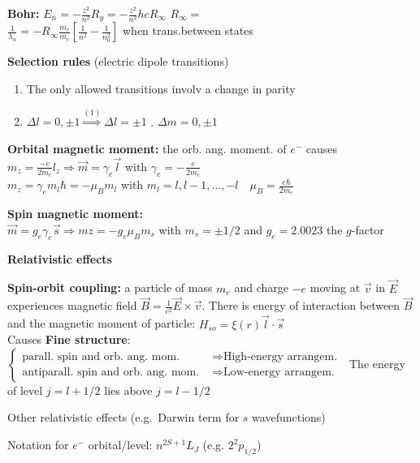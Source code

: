 
\begin{squishlist}
    \item \textbf{Bohr:} $E_n = - \frac{z^2}{n^2} R_y = - \frac{z^2}{n^2}h c R_{\infty}$ \quad $R_{\infty} = $\\
     $\frac{1}{\lambda_n} = - R_{\infty} \frac{m_r}{m_e} \left[ \frac{1}{n^2} - \frac{1}{n_0^2}\right]$ when trans.between states
    
    \item \textbf{Selection rules} (electric dipole transitions)
        \begin{enumerate}
            \item The only allowed transitions involv a change in parity
            \item $\Delta l = 0, \pm1 \overset{(1)}{\Longrightarrow} \Delta l = \pm 1$ . $\Delta m = 0, \pm 1$
        \end{enumerate}
    
        \item \textbf{Orbital magnetic moment:} the orb. ang. moment. of $e^-$ causes \\
        $m_z = \frac{-e}{2m_e}l_z \Rightarrow \vec{m} = \gamma_e \vec{l}$ with $\gamma_e = -\frac{e}{2m_e}$\\
        $m_z = \gamma_e m_l \hbar = -\mu_B m_l$ with $m_l = l, l-1, \ldots, -l \quad \mu_B = \frac{e\hbar}{2m_e}$

        \item \textbf{Spin magnetic moment:} \\ $\vec{m} = g_e \gamma_e \vec{s} \Longrightarrow mz = -g_e \mu_B m_s$ with $m_s=\pm1/2$ and $g_e = 2.0023$ the $g$-factor
    \end{squishlist} 
    
    \squishline

\textbf{Relativistic effects}
\begin{squishlist}
    \item \textbf{Spin-orbit coupling:} a particle of mass $m_e$ and charge $-e$ moving at $\vec{v}$ in $\vec{E}$ experiences magnetic field $\vec{B} = \frac{1}{c^2}\vec{E}\times \vec{v}$. There is energy of interaction between $\vec{B}$ and the magnetic moment of particle: $H_{so} = \xi(r) \vec{l}\cdot \vec{s}$ \\
    Causes \textbf{Fine structure}: $\left\{\begin{aligned}
        \text{parall.\ spin and orb.\ ang.\ mom.\ } &\Rightarrow \text{High-energy arrangem.\ } \\
        \text{antiparall.\ spin and orb.\ ang.\ mom.\ } &\Rightarrow \text{Low-energy arrangem.\ }
    \end{aligned} \right.$
    The energy of level $j = l+1/2$ lies above $j = l-1/2$

    \item Other relativistic effects (e.g.\ Darwin term for $s$ wavefunctions)
    \item Notation for $e^-$ orbital/level: $n^{2S+1}L_J$ (e.g. $2^2 p_{1/2}$)
\end{squishlist}

